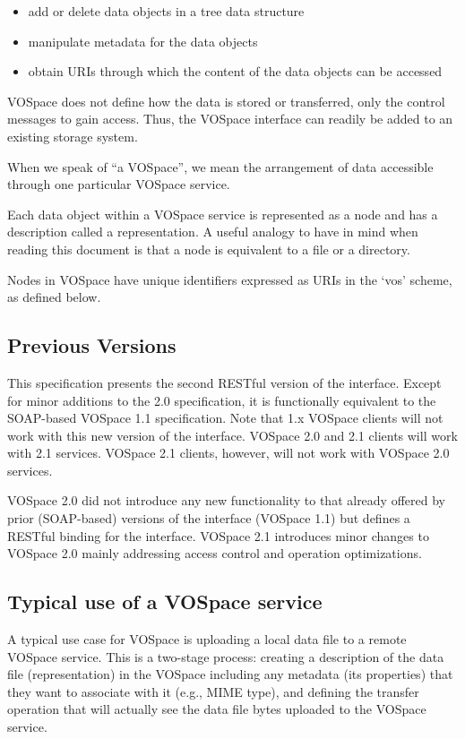 \documentclass[11pt,a4paper]{ivoa}
\begin{document}
\begin{itemize}
    \item add or delete data objects in a tree data structure
    \item manipulate metadata for the data objects
    \item obtain URIs through which the content of the data objects can be accessed
\end{itemize}
VOSpace does not define how the data is stored or transferred, only the control messages to gain access. Thus, the VOSpace interface can readily be added to an existing storage system.

When we speak of ``a VOSpace'', we mean the arrangement of data accessible through one particular VOSpace service.

Each data object within a VOSpace service is represented as a node and has a description called a representation. A useful analogy to have in mind when reading this document is that a node is equivalent to a file or a directory.

Nodes in VOSpace have unique identifiers expressed as URIs in the `vos' scheme, as defined below.

\subsection{Previous Versions}
\label{subsec:previousversions}

This specification presents the second RESTful version of the interface. Except for minor additions to the 2.0 specification, it is functionally equivalent to the SOAP-based VOSpace 1.1 specification. Note that 1.x VOSpace clients will not work with this new version of the interface. VOSpace 2.0 and 2.1 clients will work with 2.1 services. VOSpace 2.1 clients, however, will not work with VOSpace 2.0 services.

VOSpace 2.0 did not introduce any new functionality to that already offered by prior (SOAP-based) versions of the interface (VOSpace 1.1) but defines a RESTful binding for the interface. VOSpace 2.1 introduces minor changes to VOSpace 2.0 mainly addressing access control and operation optimizations.

\subsection{Typical use of a VOSpace service}
\label{subsec:typical use of a vospace service}
A typical use case for VOSpace is uploading a local data file to a remote VOSpace service. This is a two-stage process: creating a description of the data file (representation) in the VOSpace including any metadata (its properties) that they want to associate with it (e.g., MIME type), and defining the transfer operation that will actually see the data file bytes uploaded to the VOSpace service.
\end{document}

